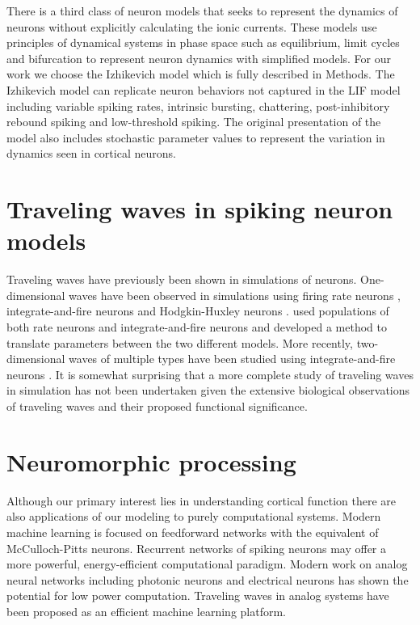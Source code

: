 There is a third class of neuron models that seeks to represent the dynamics of neurons without explicitly calculating the ionic currents.
These models use principles of dynamical systems in phase space such as equilibrium, limit cycles and bifurcation to represent neuron dynamics with simplified models.
For our work we choose the Izhikevich model\citep{izhikevich2003} which is fully described in Methods.
The Izhikevich model can replicate neuron behaviors not captured in the LIF model including variable spiking rates, intrinsic bursting, chattering, post-inhibitory rebound spiking and low-threshold spiking.
The original presentation of the model also includes stochastic parameter values to represent the variation in dynamics seen in cortical neurons.

\section{Traveling waves in spiking neuron models}
Traveling waves have previously been shown in simulations of neurons.
One-dimensional waves have been observed in simulations using firing rate neurons \citep{Roxin2005}, integrate-and-fire neurons \citep{Bressloff1997}\citep{Golomb1999} and Hodgkin-Huxley neurons \citep{Golomb1997}.
\citet{Senk2020} used populations of both rate neurons and integrate-and-fire neurons and developed a method to translate parameters between the two different models.
More recently, two-dimensional waves of multiple types have been studied using integrate-and-fire neurons \citep{Mehring2003}\citep{keane2015}\citep{Keane2018}\citep{Spreizer2019}\citep{Chen2019}.
It is somewhat surprising that a  more complete study of traveling waves in simulation has not been undertaken given the extensive biological observations of traveling waves
and their proposed functional significance.

\section{Neuromorphic processing}
Although our primary interest lies in understanding cortical function there are also applications of our modeling to purely computational systems.
Modern machine learning is focused on feedforward networks with the equivalent of McCulloch-Pitts neurons.
Recurrent networks of spiking neurons may offer a more powerful, energy-efficient computational paradigm.
Modern work on analog neural networks including photonic neurons\citep{Xiang2016}\citep{Coarer2018}\citep{Fok2010} and electrical neurons has shown the potential for low power computation.
Traveling waves in analog systems have been proposed as an efficient machine learning platform\citep{Hughes2019}.

